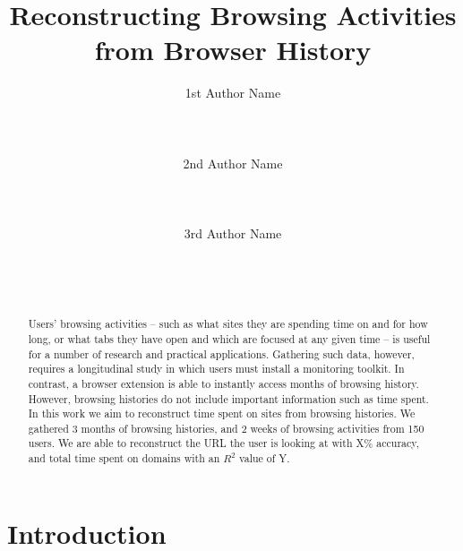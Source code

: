 \documentclass{sigchi}
\begin{document}
\title{Reconstructing Browsing Activities from Browser History}

\author{
  \alignauthor 1st Author Name\\
    \\
    \\
    \\
  \alignauthor 2nd Author Name\\
    \\
    \\
    \\
  \alignauthor 3rd Author Name\\
    \\
    \\
    \\
}

\maketitle

\begin{abstract}
Users' browsing activities -- such as what sites they are spending time on and for how long, or what tabs they have open and which are focused at any given time -- is useful for a number of research and practical applications. Gathering such data, however, requires a longitudinal study in which users must install a monitoring toolkit. In contrast, a browser extension is able to instantly access months of browsing history. However, browsing histories do not include important information such as time spent. In this work we aim to reconstruct time spent on sites from browsing histories. We gathered 3 months of browsing histories, and 2 weeks of browsing activities from 150 users. We are able to reconstruct the URL the user is looking at with X\% accuracy, and total time spent on domains with an $R^2$ value of Y.
\end{abstract}



\section{Introduction}
\end{document}
